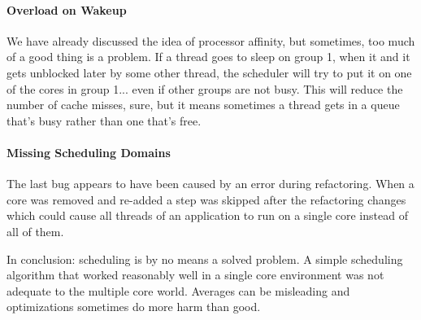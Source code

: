 \paragraph{Overload on Wakeup} We have already discussed the idea of processor affinity, but sometimes, too much of a good thing is a problem. If a thread goes to sleep on group 1, when it and it gets unblocked later by some other thread, the scheduler will try to put it on one of the cores in group 1... even if other groups are not busy. This will reduce the number of cache misses, sure, but it means sometimes a thread gets in a queue that's busy rather than one that's free.

\paragraph{Missing Scheduling Domains}
The last bug appears to have been caused by an error during refactoring. When a core was removed and re-added a step was skipped after the refactoring changes which could cause all threads of an application to run on a single core instead of all of them. 

In conclusion: scheduling is by no means a solved problem. A simple scheduling algorithm that worked reasonably well in a single core environment was not adequate to the multiple core world. Averages can be misleading and optimizations sometimes do more harm than good. 




